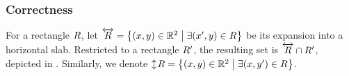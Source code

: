 \documentclass[12pt]{article}%
\begin{document}
\subsubsection{Correctness}


For a rectangle $R$, let
$\overleftrightarrow{R} = \left\{ (x,y)\in \mathbb{R}^2 \;\middle\vert\; \exists (x',y) \in R \right\}$ be
its expansion into a horizontal slab. Restricted to a rectangle
$R'$, the resulting set is $\overleftrightarrow{R} \cap R'$, depicted
in .  Similarly, we denote
$\updownarrow\!{R} = \left\{ (x,y)\in \mathbb{R}^2 \;\middle\vert\; \exists (x,y') \in R \right\}$.
\end{document}
